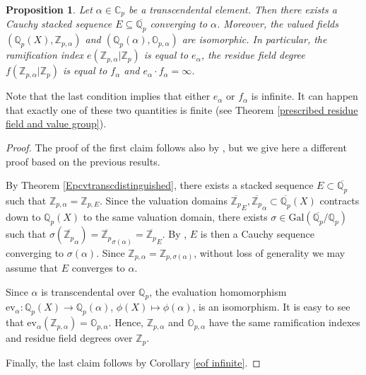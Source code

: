 \documentclass[10pt]{article}
\numberwithin{equation}{section}
\newtheorem{Prop}[equation]{Proposition}
\theoremstyle{definition}\newtheorem{Def}[equation]{Definition}
\theoremstyle{definition}\newtheorem{Ques}[equation]{Question}
\newcommand{\Q}{\mathbb{Q}}
\newcommand{\N}{\mathbb{N}}
\newcommand{\Z}{\mathbb{Z}}
\renewcommand{\O}{\mathbb{O}}
\newcommand{\C}{\mathbb{C}}
\newcommand{\oQp}{\overline{\Q_p}}
\newcommand{\Gal}{\text{Gal}}
\newcommand{\oZp}{\overline{\Z_p}}
\newcommand\rc { \color{red}}
\begin{document}
\begin{Prop}\label{ef transcendental elements Cp}
Let $\alpha\in\C_p$ be a transcendental element. Then there exists a Cauchy stacked sequence $E\subseteq\oQp$ converging to $\alpha$. Moreover, the valued fields $(\Q_p(X),\Z_{p,\alpha})$ and $(\Q_p(\alpha),\O_{p,\alpha})$ are isomorphic.  In particular, the ramification index $e(\Z_{p,\alpha}|\Z_p)$ is equal to $e_{\alpha}$, the residue field degree $f(\Z_{p,\alpha}|\Z_p)$ is equal to $f_{\alpha}$ and $e_{\alpha}\cdot f_{\alpha}=\infty$. 
\end{Prop}
Note that the last condition implies that either $e_{\alpha}$ or $f_{\alpha}$ is infinite. It can happen that exactly one of these two quantities is finite (see Theorem \ref{prescribed residue field and value group}).
\begin{proof}
The proof of the first claim follows also by \cite[Proposition 2.2]{APZclosed}, but we give here a different proof based on the previous results. 


By Theorem \ref{Epcvtranscdistinguished}, there exists a stacked sequence $E\subset\oQp$ such that $\Z_{p,\alpha}=\Z_{p,E}$. Since the valuation domains $\oZp_{E},\oZp_{\alpha}\subset\oQp(X)$ contracts down to $\Q_p(X)$ to the same valuation domain, there exists $\sigma\in\Gal(\oQp/\Q_p)$ such that $\sigma(\oZp_{\alpha})=\oZp_{\sigma(\alpha)}=\oZp_{E}$. By \cite[Proposition 5.3]{PS2}, $E$ is then a Cauchy sequence converging to $\sigma(\alpha)$. Since $\Z_{p,\alpha}=\Z_{p,\sigma(\alpha)}$, without loss of generality we may assume that $E$ converges to $\alpha$. 

Since $\alpha$ is transcendental over $\Q_p$, the evaluation homomorphism $\text{ev}_{\alpha}:\Q_p(X)\to\Q_p(\alpha)$, $\phi(X)\mapsto\phi(\alpha)$, is an isomorphism. It is easy to see that $\text{ev}_{\alpha}(\Z_{p,\alpha})=\O_{p,\alpha}$. Hence, $\Z_{p,\alpha}$ and $\O_{p,\alpha}$ have the same ramification indexes and residue field degrees over $\Z_p$. 

Finally, the last claim follows by Corollary \ref{eof infinite}.
\end{proof}
\end{document}
